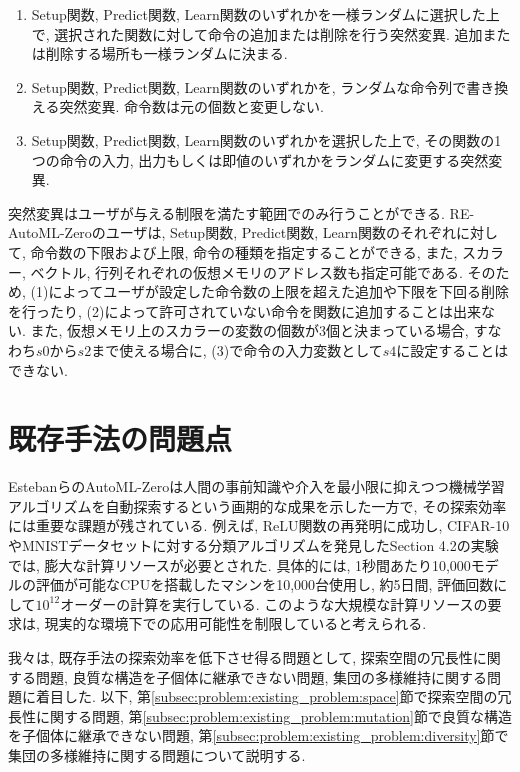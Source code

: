 \documentclass[11pt,oneside,openany,report]{jsbook}
\begin{document}
\begin{enumerate}
  \renewcommand{\labelenumi}{(\arabic{enumi})}
  \item Setup関数, Predict関数, Learn関数のいずれかを一様ランダムに選択した上で, 選択された関数に対して命令の追加または削除を行う突然変異. 追加または削除する場所も一様ランダムに決まる.
  \item Setup関数, Predict関数, Learn関数のいずれかを, ランダムな命令列で書き換える突然変異. 命令数は元の個数と変更しない.
  \item Setup関数, Predict関数, Learn関数のいずれかを選択した上で, その関数の1つの命令の入力, 出力もしくは即値のいずれかをランダムに変更する突然変異.
\end{enumerate}
\noindent
突然変異はユーザが与える制限を満たす範囲でのみ行うことができる. RE-AutoML-Zeroのユーザは, Setup関数, Predict関数, Learn関数のそれぞれに対して, 命令数の下限および上限, 命令の種類を指定することができる, また, スカラー, ベクトル, 行列それぞれの仮想メモリのアドレス数も指定可能である. そのため, (1)によってユーザが設定した命令数の上限を超えた追加や下限を下回る削除を行ったり, (2)によって許可されていない命令を関数に追加することは出来ない. また, 仮想メモリ上のスカラーの変数の個数が3個と決まっている場合, すなわち$s0$から$s2$まで使える場合に, (3)で命令の入力変数として$s4$に設定することはできない.

\section{既存手法の問題点}\label{sec:problem:existing_problem}

EstebanらのAutoML-Zeroは人間の事前知識や介入を最小限に抑えつつ機械学習アルゴリズムを自動探索するという画期的な成果を示した一方で, その探索効率には重要な課題が残されている. 例えば, ReLU関数の再発明に成功し, CIFAR-10やMNISTデータセットに対する分類アルゴリズムを発見したSection 4.2の実験では, 膨大な計算リソースが必要とされた. 具体的には, 1秒間あたり10,000モデルの評価が可能なCPUを搭載したマシンを10,000台使用し, 約5日間, 評価回数にして$10^{12}$オーダーの計算を実行している. このような大規模な計算リソースの要求は, 現実的な環境下での応用可能性を制限していると考えられる.

我々は, 既存手法の探索効率を低下させ得る問題として, 探索空間の冗長性に関する問題, 良質な構造を子個体に継承できない問題, 集団の多様維持に関する問題に着目した. 以下, 第\ref{subsec:problem:existing_problem:space}節で探索空間の冗長性に関する問題, 第\ref{subsec:problem:existing_problem:mutation}節で良質な構造を子個体に継承できない問題, 第\ref{subsec:problem:existing_problem:diversity}節で集団の多様維持に関する問題について説明する.
\end{document}
